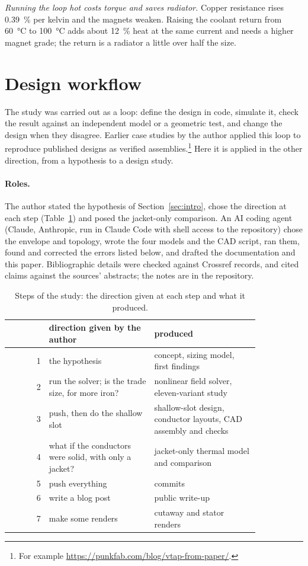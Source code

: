 \documentclass[11pt]{article}
\begin{document}
\emph{Running the loop hot costs torque and saves radiator.} Copper resistance
rises \SI{0.39}{\percent} per kelvin and the magnets weaken. Raising the
coolant return from \SI{60}{\celsius} to \SI{100}{\celsius} adds about
\SI{12}{\percent} heat at the same current and needs a higher magnet grade;
the return is a radiator a little over half the size.

\section{Design workflow}
\label{sec:process}

The study was carried out as a loop: define the design in code, simulate it,
check the result against an independent model or a geometric test, and change
the design when they disagree. Earlier case studies by the author applied this
loop to reproduce published designs as verified
assemblies.\footnote{For example
\url{https://punkfab.com/blog/vtap-from-paper/}.} Here it is applied in the
other direction, from a hypothesis to a design study.

\paragraph{Roles.} The author stated the hypothesis of
Section~\ref{sec:intro}, chose the direction at each step
(Table~\ref{tab:prompts}) and posed the jacket-only comparison. An AI coding
agent (Claude, Anthropic, run in Claude Code with shell access to the
repository) chose the envelope and topology, wrote the four models and the CAD
script, ran them, found and corrected the errors listed below, and drafted the
documentation and this paper. Bibliographic details were checked against
Crossref records, and cited claims against the sources' abstracts; the notes
are in the repository.

\begin{table}[h]
\centering
\small
\begin{tabular}{rp{0.42\linewidth}p{0.42\linewidth}}
\toprule
 & direction given by the author & produced\\
\midrule
1 & the hypothesis & concept, sizing model, first findings\\
2 & run the solver; is the trade size, for more iron? & nonlinear field solver, eleven-variant study\\
3 & push, then do the shallow slot & shallow-slot design, conductor layouts, CAD assembly and checks\\
4 & what if the conductors were solid, with only a jacket? & jacket-only thermal model and comparison\\
5 & push everything & commits\\
6 & write a blog post & public write-up\\
7 & make some renders & cutaway and stator renders\\
\bottomrule
\end{tabular}
\caption{Steps of the study: the direction given at each step and what it
produced.}
\label{tab:prompts}
\end{table}
\end{document}
